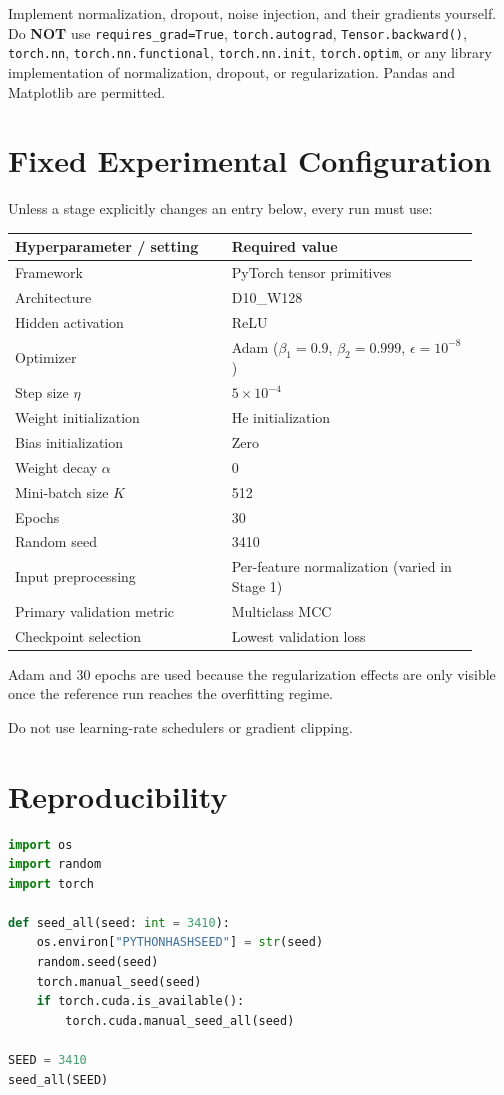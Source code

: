 \documentclass[11pt]{article}
\begin{document}
Implement normalization, dropout, noise injection, and their gradients yourself. Do \textbf{NOT} use \texttt{requires\_grad=True}, \texttt{torch.autograd}, \texttt{Tensor.backward()}, \texttt{torch.nn}, \texttt{torch.nn.functional}, \texttt{torch.nn.init}, \texttt{torch.optim}, or any library implementation of normalization, dropout, or regularization. Pandas and Matplotlib are permitted.

\section{Fixed Experimental Configuration}
Unless a stage explicitly changes an entry below, every run must use:

\begin{center}
\begin{tabular}{>{\raggedright\arraybackslash}p{0.43\linewidth} p{0.49\linewidth}}
\toprule
Hyperparameter / setting & Required value \\
\midrule
Framework & PyTorch tensor primitives \\
Architecture & D10\_W128 \\
Hidden activation & ReLU \\
Optimizer & Adam ($\beta_1=0.9$, $\beta_2=0.999$, $\epsilon=10^{-8}$) \\
Step size $\eta$ & $5\times10^{-4}$ \\
Weight initialization & He initialization \\
Bias initialization & Zero \\
Weight decay $\alpha$ & $0$ \\
Mini-batch size $K$ & 512 \\
Epochs & 30 \\
Random seed & 3410 \\
Input preprocessing & Per-feature normalization (varied in Stage 1) \\
Primary validation metric & Multiclass MCC \\
Checkpoint selection & Lowest validation loss \\
\bottomrule
\end{tabular}
\end{center}

Adam and 30 epochs are used because the regularization effects are only visible once the reference run reaches the overfitting regime.

Do not use learning-rate schedulers or gradient clipping.

\section{Reproducibility}
\begin{lstlisting}[language=Python]
import os
import random
import torch

def seed_all(seed: int = 3410):
    os.environ["PYTHONHASHSEED"] = str(seed)
    random.seed(seed)
    torch.manual_seed(seed)
    if torch.cuda.is_available():
        torch.cuda.manual_seed_all(seed)

SEED = 3410
seed_all(SEED)
\end{lstlisting}
\end{document}

